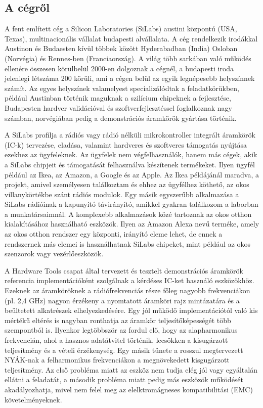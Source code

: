 \documentclass[a4paper,12pt,titlepage]{article}
\begin{document}
	\subsection{A cégről}
		A fent említett cég a Silicon Laboratories (SiLabs) austini központú (USA, Texas), multinacionális vállalat budapesti alvállalata. A cég rendelkezik irodákkal Austinon és Budaesten kívül többek között Hyderabadban (India) Osloban (Norvégia) és Rennes-ben (Franciaország). A világ több sarkában való működés ellenére összesen körülbelül 2000-en dolgoznak a cégnél, a budapesti iroda jelenlegi létszáma 200 körüli, ami a cégen belül az egyik legnépesebb helyszínnek számít. Az egyes helyszínek valamelyest specializálódtak a feladatkörükben, például Austinban történik maguknak a szilícium chipeknek a fejlesztése, Budapesten hardver validációval és szoftverfejlesztéssel foglalkoznak nagy számban, norvégiában pedig a demonstrációs áramkörök gyártása történik.
		\par
		A SiLabs profilja a rádiós vagy rádió nélküli mikrokontroller integrált áramkörök (IC-k) tervezése, eladása, valamint hardveres és szoftveres támogatás nyújtása ezekhez az ügyfeleknek. Az ügyfelek nem végfelhasználók, hanem más cégek, akik a SiLabs chipjeit és támogatását felhasználva készítenek termékeket. Ilyen ügyfél például az Ikea, az Amazon, a Google és az Apple. Az Ikea példájánál maradva, a projekt, amivel személyesen találkoztam és ehhez az ügyfélhez köthető, az okos villanykörtékbe szánt rádiós modulok. Egy másik egyszerűbb alkalmazása a SiLabs rádióinak a kapunyitó távirányító, amikkel gyakran találkozom a laborban a munkatársaimnál. A komplexebb alkalmazások közé tartoznak az okos otthon kialakításához használható eszközök. Ilyen az Amazon Alexa nevű terméke, amely az okos otthon rendszer egy központi, irányító eleme lehet, de ennek a rendszernek más elemei is használhatnak SiLabs chipeket, mint például az okos szenzorok vagy vezérlőeszközök.
		\par
		A Hardware Tools csapat által tervezett és tesztelt demonstrációs áramkörök referencia implementációként szolgálnak a kérdéses IC-ket használó eszközökhöz. Ezeknek az áramköröknek a rádiófrekvenciás része főleg nagyobb frekvenciákon (pl. 2,4 GHz) nagyon érzékeny a nyomtatott áramköri rajz mintázatára és a beültetett alkatrészek elhelyezkedésére. Egy jól működő implementációtól való kis mértékű eltérés is nagyban ronthatja az áramkör teljesítőképességét több szempontból is. Ilyenkor legtöbbször az fordul elő, hogy az alapharmonikus frekvencián, ahol a hasznos adatátvitel történik, lecsökken a kisugárzott teljesítmény és a vételi érzékenység. Egy másik tünete a rosszul megtervezett NYÁK-nak a felharmonikus frekvenciákon a megnövekedett kisgugárzott teljesítmény. Az első probléma miatt az eszköz nem tudja elég jól vagy egyáltalán ellátni a feladatát, a második probléma miatt pedig más eszközök működését akadályozhatja, mivel nem felel meg az elelktromágneses kompatibilitási (EMC) követelményeknek.
\end{document}
